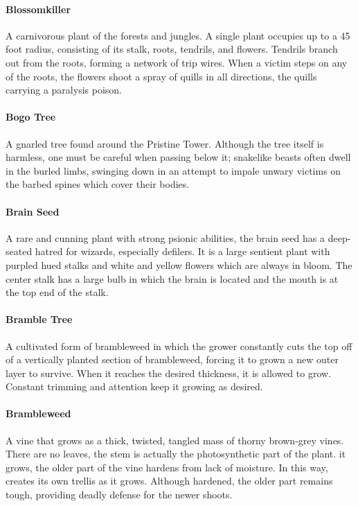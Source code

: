 \begin{multicols}{2}
\paragraph{Blossomkiller}
A carnivorous plant of the forests and jungles. A single plant occupies up to a
45 foot radius, consisting of its stalk, roots, tendrils, and flowers. Tendrils
branch out from the roots, forming a network of trip wires. When a victim steps
on any of the roots, the flowers shoot a spray of quills in all directions, the
quills carrying a paralysis poison.

\paragraph{Bogo Tree}
A gnarled tree found around the Pristine Tower. Although the tree itself is
harmless, one must be careful when passing below it; snakelike beasts often
dwell in the burled limbs, swinging down in an attempt to impale unwary victims
on the barbed spines which cover their bodies.

\paragraph{Brain Seed}
A rare and cunning plant with strong psionic abilities, the brain seed has a
deep-seated hatred for wizards, especially defilers. It is a large sentient
plant with purpled hued stalks and white and yellow flowers which are always
in bloom. The center stalk has a large bulb in which the brain is located and
the mouth is at the top end of the stalk.

\paragraph{Bramble Tree}
A cultivated form of brambleweed in which the grower constantly cuts the top
off of a vertically planted section of brambleweed, forcing it to grown a new
outer layer to survive. When it reaches the desired thickness, it is allowed
to grow. Constant trimming and attention keep it growing as desired.

\paragraph{Brambleweed}
A vine that grows as a thick, twisted, tangled mass of thorny brown-grey vines.
There are no leaves, the stem is actually the photosynthetic part of the plant.
it grows, the older part of the vine hardens from lack of moisture. In this way,
creates its own trellis as it grows. Although hardened, the older part remains tough,
providing deadly defense for the newer shoots.


\end{multicols}
